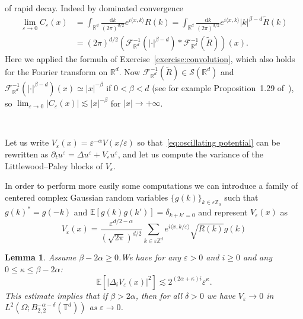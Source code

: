 \documentclass[a4paper,11pt]{article}
\newcommand{\mathd}{\mathrm{d}}
\newtheorem{lemma}{Lemma}
{\theorembodyfont{\rmfamily}\newtheorem{remark}{Remark}}
\newcommand{\CF}{\mathscr{F}}
\newcommand{\CS}{\mathscr{S}}
\begin{document}
of rapid decay. Indeed by dominated convergence
\begin{align*}
   \lim_{\varepsilon \rightarrow 0} C_{\varepsilon} (x) & = \int_{\mathbb{R}^d} \frac{\mathd k}{(2 \pi)^{d / 2}} e^{i \langle x, k \rangle} R (k) = \int_{\mathbb{R}^d} \frac{\mathd k}{(2 \pi)^{d / 2}} e^{i \langle x, k \rangle} | k |^{\beta - d} \tilde{R} (k) \\
    & = (2 \pi)^{d / 2} \left( \CF^{- 1}_{\mathbb{R}^d} (| \cdot |^{\beta - d}) \ast \CF_{\mathbb{R}^d}^{- 1} (\tilde{R}) \right) (x) .
\end{align*}
Here we applied the formula of Exercise~\ref{exercise:convolution}, which also holds for the Fourier transform on $\mathbb{R}^d$. Now $\CF^{- 1}_{\mathbb{R}^d} (\tilde{R}) \in \CS (\mathbb{R}^d)$ and
$\CF^{- 1}_{\mathbb{R}^d} (| \cdot |^{\beta - d}) (x) \simeq | x |^{- \beta}$
if $0 < \beta < d$ (see for example Proposition~1.29 of~{\cite{Bahouri2011}}),
so $\lim_{\varepsilon \rightarrow 0} | C_{\varepsilon} (x) | \lesssim | x |^{-
\beta}$ for $| x | \rightarrow + \infty$.

\

Let us write $V_{\varepsilon} (x) = \varepsilon^{- \alpha} V (x /
\varepsilon)$ so that~\eqref{eq:oscillating potential} can be rewritten as $\partial_t u^{\varepsilon} = \Delta u^{\varepsilon} +
V_{\varepsilon} u^{\varepsilon}$, and let us compute the variance of the
Littlewood--Paley blocks of $V_{\varepsilon}$.

In order to perform more easily some computations we can introduce a family of
centered complex Gaussian random variables $\{ g (k) \}_{k \in \varepsilon
\mathbb{Z}_0}$ such that $g (k)^{\ast} = g (- k)$ and $\mathbb{E} [g (k) g
(k')] = \delta_{k + k' = 0}$ and represent $V_{\varepsilon} (x)$ as
\[ V_{\varepsilon} (x) = \frac{\varepsilon^{d / 2 - \alpha}}{( \sqrt{2
   \pi} )^{d / 2}} \sum_{k \in \varepsilon \mathbb{Z}^d} e^{i \langle
   x, k / \varepsilon \rangle} \sqrt{R (k)} g (k) \]


\begin{lemma}\label{lem:Veps reg}
  Assume $\beta - 2 \alpha \geqslant 0$.We have for any $\varepsilon > 0$ and
  $i \geqslant 0$ and any $0 \leqslant \kappa \leqslant \beta - 2 \alpha$:
  \[ \mathbb{E} [| \Delta_i V_{\varepsilon} (x) |^2] \lesssim 2^{(2 \alpha +
     \kappa) i} \varepsilon^{\kappa} . \]
  This estimate implies that if $\beta > 2 \alpha$, then for all  $\delta > 0$ we have $V_{\varepsilon} \rightarrow 0$ in $L^2 (\Omega ; B^{- \alpha - \delta}_{2, 2} (\mathbb{T}^d))$ as $\varepsilon \rightarrow 0$.
\end{lemma}
\end{document}
